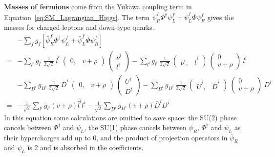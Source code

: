 \textbf{Masses of fermions} come from the Yukawa coupling term in Equation~\ref{eq:SM_Lagrangian_Higgs}.
The term $\bar{\psi}^{f}_{R}\Phi^{\dagger}\psi^{f}_{L} + \bar{\psi}^{f}_{L}\Phi\psi^{f}_{R}$ gives the masses for charged leptons and down-type quarks.
\begin{equation}\label{eq:yukawa_mass}
  \begin{split}
      & -\sum_{f} g_{f} [\bar{\psi}^{f}_{R}\Phi^{\dagger}\psi^{f}_{L} + \bar{\psi}^{f}_{L}\Phi\psi^{f}_{R} ] \\
    = & - \sum_{l^{i}} g_{l^{i}} ~\frac{1}{2\sqrt{2}}~\bar{l}^{i} ~\begin{pmatrix} 0 ,& v+\rho \end{pmatrix} ~\begin{pmatrix} \nu^{i} \\ l^{i} \end{pmatrix}
        - \sum_{l^{i}} g_{l^{i}} ~\frac{1}{2\sqrt{2}}~\begin{pmatrix} \bar{\nu}^{i} ,& \bar{l}^{i} \end{pmatrix} ~\begin{pmatrix} 0 \\ v+\rho \end{pmatrix} ~l^{i} \\
      & - \sum_{D^{i}} g_{D^{i}} ~\frac{1}{2\sqrt{2}}~\bar{D}^{i} ~\begin{pmatrix} 0 ,& v+\rho \end{pmatrix} ~\begin{pmatrix} U^{i} \\ D^{i} \end{pmatrix}
        - \sum_{D^{i}} g_{D^{i}} ~\frac{1}{2\sqrt{2}}~\begin{pmatrix} \bar{U}^{i} ,& \bar{D}^{i} \end{pmatrix} ~\begin{pmatrix} 0 \\ v+\rho \end{pmatrix} ~D^{i} \\
    = & - \frac{1}{\sqrt{2}} \sum_{l^{i}} g_{l^{i}}  (v+\rho) \bar{l}^{i} l^{i}
        - \frac{1}{\sqrt{2}} \sum_{D^{i}} g_{D^{i}}  (v+\rho) \bar{D}^{i} D^{i}    
  \end{split}
\end{equation}
In this equation some calculations are omitted to save space:
the SU(2) phase cancels between $\Phi^{\dagger}$ and $\psi_{L}$, 
the SU(1) phase cancels between $\bar{\psi_{R}}$, $\Phi^{\dagger}$ and $\psi_{L}$ as their hypercharges add up to 0,
and the product of projection operators in $\bar{\psi}_{R}$ and $\psi_{L}$ is 2 and is absorbed in the coefficients.
